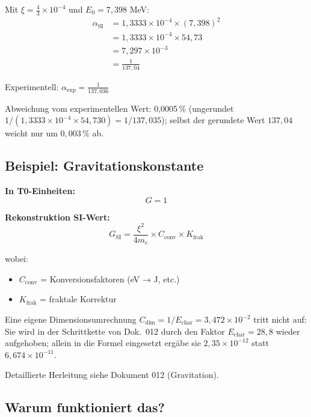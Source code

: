 	Mit $\xi = \frac{4}{3} \times 10^{-4}$ und $E_0 = 7{,}398$ MeV:
	\begin{align}
		\alpha_{\text{SI}} &= 1{,}3333 \times 10^{-4} \times (7{,}398)^2 \\
		&= 1{,}3333 \times 10^{-4} \times 54{,}73 \\
		&= 7{,}297 \times 10^{-3} \\
		&= \frac{1}{137{,}04}
	\end{align}
	
	Experimentell: $\alpha_{\text{exp}} = \frac{1}{137{,}036}$
	
	Abweichung vom experimentellen Wert: 0{,}0005\,\% (ungerundet $1/(1{,}3333\times10^{-4}\times54{,}730) = 1/137{,}035$); selbst der gerundete Wert $137{,}04$ weicht nur um $0{,}003\,\%$ ab.
	
	\subsection{Beispiel: Gravitationskonstante}
	
	\textbf{In T0-Einheiten:}
	\begin{equation}
		G = 1
	\end{equation}
	
	\textbf{Rekonstruktion SI-Wert:}
	\begin{equation}
		G_{\text{SI}} = \frac{\xi^2}{4m_e} \times C_{\text{conv}} \times K_{\text{frak}}
	\end{equation}
	
	wobei:
	\begin{itemize}
		\item $C_{\text{conv}}$ = Konversionsfaktoren (eV → J, etc.)
		\item $K_{\text{frak}}$ = fraktale Korrektur
	\end{itemize}
	
	Eine eigene Dimensionsumrechnung $C_{\text{dim}} = 1/E_{\text{char}} = 3{,}472\times10^{-2}$ tritt nicht auf: Sie wird in der Schrittkette von Dok.~012 durch den Faktor $E_{\text{char}} = 28{,}8$ wieder aufgehoben; allein in die Formel eingesetzt ergäbe sie $2{,}35\times10^{-12}$ statt $6{,}674\times10^{-11}$.
	
	Detaillierte Herleitung siehe Dokument 012 (Gravitation).
	
	\subsection{Warum funktioniert das?}
	
